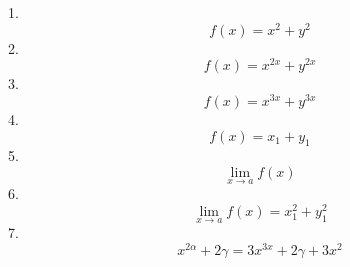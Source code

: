 \documentclass[10pt]{article}
\begin{document}
1.  \[ f(x)=x^2+y^2 \]
2.  \[ f(x)=x^{2x}+y^{2x} \]
3.  \[ f(x)=x^{3x}+y^{3x} \]
4.  \[ f(x)=x_1+y_1 \]
5.  \[ \lim_{x \to a}f(x) \]
6.  \[ \lim_{x \to a}f(x)=x_1^2+y_1^2 \]
7.  \[ x^{2\alpha}+2\gamma=3x^{3x}+2\gamma+3x^2 \]
\end{document}
